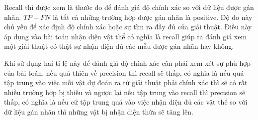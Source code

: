Recall thì được xem là thước đo để đánh giá độ chính xác so với dữ liệu được gán nhãn. $TP + FN$ là tất cả những trường hợp được gán nhãn là positive. Độ đo này chủ yếu để xác định độ chính xác hoặc sự tìm ra đầy đủ của giải thuật. Điều này áp dụng vào bài toán nhận diện vật thể có nghĩa là recall giúp ta đánh giá xem một giải thuật có thật sự nhận diện đủ các mẫu được gán nhãn hay không.

Khi sử dụng hai tỉ lệ này để đánh giá độ chính xác cân phải xem xét sự phù hợp của bài toán, nếu quá thiên về precision thì recall sẽ thấp, có nghĩa là nếu quá tập trung vào việc mỗi vật dự đoán ra từ giải thuật phải chính xác thì sẽ có rất nhiều trường hợp bị thiếu và ngược lại nếu tập trung vào recall thì precision sẽ thấp, có nghĩa là nếu cứ tập trung quá vào việc nhận diện đủ các vật thể so với dữ liệu gán nhãn thì những vật bị nhận diện thừa sẽ tăng lên.
